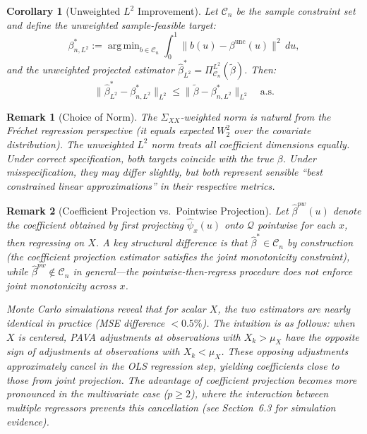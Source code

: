 \documentclass[12pt]{article}
\DeclareMathOperator*{\argmin}{arg\,min}
\newcommand{\calQ}{\mathcal{Q}}
\newtheorem{corollary}{Corollary}
\newtheorem{remark}{Remark}
\begin{document}
\begin{corollary}[Unweighted $L^2$ Improvement]\label{cor:unweighted}
Let $\mathcal{C}_n$ be the sample constraint set and define the unweighted sample-feasible target:
\[
\beta^*_{n,L^2} := \argmin_{b \in \mathcal{C}_n} \int_0^1 \|b(u) - \beta^{\text{unc}}(u)\|^2 \, du,
\]
and the unweighted projected estimator $\hat{\beta}^*_{L^2} = \Pi_{\mathcal{C}_n}^{L^2}(\tilde{\beta})$. Then:
\begin{equation}
\|\hat{\beta}^*_{L^2} - \beta^*_{n,L^2}\|_{L^2} \leq \|\tilde{\beta} - \beta^*_{n,L^2}\|_{L^2} \quad \text{a.s.}
\end{equation}
\end{corollary}

\begin{remark}[Choice of Norm]
The $\Sigma_{XX}$-weighted norm is natural from the Fréchet regression perspective (it equals expected $W_2^2$ over the covariate distribution). The unweighted $L^2$ norm treats all coefficient dimensions equally. Under correct specification, both targets coincide with the true $\beta$. Under misspecification, they may differ slightly, but both represent sensible ``best constrained linear approximations'' in their respective metrics.
\end{remark}

\begin{remark}[Coefficient Projection vs.\ Pointwise Projection]\label{rem:pw-comparison}
Let $\hat{\beta}^{pw}(u)$ denote the coefficient obtained by first projecting $\hat{\psi}_x(u)$ onto $\calQ$ pointwise for each $x$, then regressing on $X$. A key structural difference is that $\hat{\beta}^* \in \mathcal{C}_n$ by construction (the coefficient projection estimator satisfies the joint monotonicity constraint), while $\hat{\beta}^{pw} \notin \mathcal{C}_n$ in general---the pointwise-then-regress procedure does not enforce joint monotonicity across $x$.

Monte Carlo simulations reveal that for scalar $X$, the two estimators are nearly identical in practice (MSE difference $< 0.5\%$). The intuition is as follows: when $X$ is centered, PAVA adjustments at observations with $X_k > \mu_X$ have the opposite sign of adjustments at observations with $X_k < \mu_X$. These opposing adjustments approximately cancel in the OLS regression step, yielding coefficients close to those from joint projection. The advantage of coefficient projection becomes more pronounced in the multivariate case ($p \geq 2$), where the interaction between multiple regressors prevents this cancellation (see Section~6.3 for simulation evidence).
\end{remark}
\end{document}
